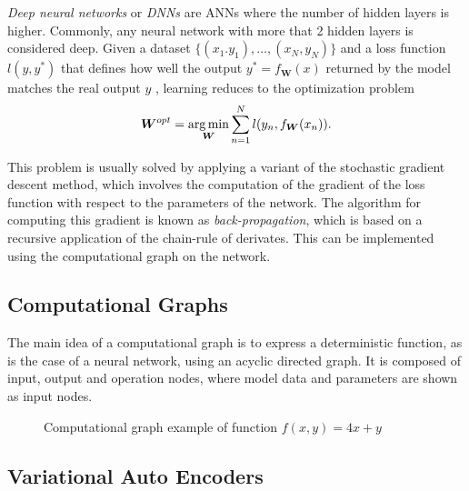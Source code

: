 \emph{Deep neural networks} or \emph{DNNs} are ANNs where the number of hidden layers is higher. Commonly, any neural network with more that 2 hidden layers is considered deep. Given a dataset \(\{(x_{1}. y_{1}), \dots, (x_{N}, y_{N})\}\) and a loss function \(l(y,y^{*})\) that defines how well the output \(y^{*} = f_{\bm{W}}(x)\)  returned by the model matches the real output \(y\) , learning reduces to the optimization problem
\[
  \bm{W}^{opt} = \operatorname*{arg\,min}_{\bm{W}} \sum_{n=1}^{N}l(y_{n}, f_{\bm{W}}(x_{n})).
\]

This problem is usually solved by applying a variant of the stochastic gradient descent method, which involves the computation of the gradient of the loss function with respect to the parameters of the network. The algorithm for computing this gradient is known as \emph{back-propagation}, which is based on a recursive application of the chain-rule of derivates. This can be implemented using the computational graph on the network.

\subsection{Computational Graphs}

The main idea of a computational graph is to express a deterministic function, as is the case of a neural network, using an acyclic directed graph. It is composed of input, output and operation nodes, where model data and parameters are shown as input nodes.

\begin{figure}[H]
  \centering
  \caption{Computational graph example of function \(f(x,y) = 4x + y\) }
  \label{fig:dnn}
\end{figure}

\subsection{Variational Auto Encoders}

